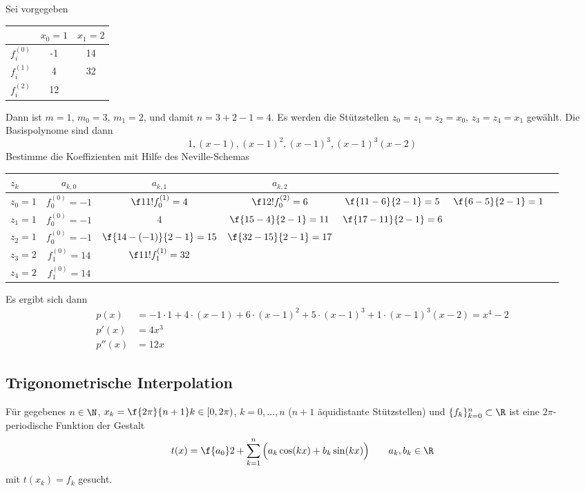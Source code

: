 \documentclass[11pt]{scrartcl}
\begin{document}
\begin{ex*}
	Sei vorgegeben

	\begin{table}[!ht]
		\centering	
		\begin{tabular}{l|c|c}
			 & $x_0=1$ & $x_1 =2$ \\ \hline
			$f_i^{(0)}$ & -1 & 14 \\
			$f_i^{(1)}$ & 4 & 32 \\
			$f_i^{(2)}$ & 12 & 
		\end{tabular}		
	\end{table}

	Dann ist $m=1$, $m_0=3$, $m_1=2$, und damit $n=3+2-1=4$.
	Es werden die Stützstellen $z_0=z_1=z_2=x_0$, $z_3=z_4=x_1$ gewählt.
	Die Basispolynome sind dann
	\[
		1, (x-1), (x-1)^2, (x-1)^3, (x-1)^3(x-2)
	\]
	Bestimme die Koeffizienten mit Hilfe des Neville-Schemas

	\begin{table}[!ht]
		\centering	
		\begin{tabular}{l|c|c|c|c|c|c}
			$z_k$  & $a_{k,0}$ & $a_{k,1}$ & $a_{k,2}$ \\ \hline
			$z_0=1$ & $f_0^{(0)} = -1$  & $\f 1{1!}f_0^{(1)} = 4$ & $\f 1{2!} f_0^{(2)} = 6$ & $\f {11-6}{2-1}=5$ & $\f {6-5}{2-1}=1$ \\
			$z_1=1$ & $f_0^{(0)} = -1$ & $4$ 						&	$\f {15-4}{2-1} = 11$ & $\f {17-11}{2-1}=6$ \\
			$z_2=1$ & $f_0^{(0)} = -1$ & $\f {14-(-1)}{2-1} = 15$ & $\f {32-15}{2-1} = 17$ \\
			$z_3=2$ & $f_1^{(0)} = 14$ & $\f 1 {1!} f_1^{(1)} = 32$ &  \\
			$z_4=2$ & $f_1^{(0)} = 14$ & 
		\end{tabular}		
	\end{table}
	Es ergibt sich dann
	\begin{align*}
		p(x)& = -1\cdot 1 + 4\cdot (x-1) + 6\cdot(x-1)^2 + 5\cdot(x-1)^3 + 1\cdot(x-1)^3 (x-2) = x^4-2\\
		p'(x) &= 4x^3\\
		p''(x) &= 12x
	\end{align*}
\end{ex*}


\subsection{Trigonometrische Interpolation}

Für gegebenes $n\in \N$, $x_k = \f {2\pi}{n+1}k \in [0,2\pi)$, $k=0,\dotsc,n$ ($n+1$ äquidistante Stützstellen) und $\{f_k\}_{k=0}^n\subset \R$ ist eine $2\pi$-periodische Funktion der Gestalt
\[
	t(x) = \f {a_0}2 + \sum_{k=1}^n \Big(a_k \cos(kx) + b_k \sin(kx) \Big) \qquad a_k,b_k \in \R
\]
mit $t(x_k)=f_k$ gesucht.
\end{document}

